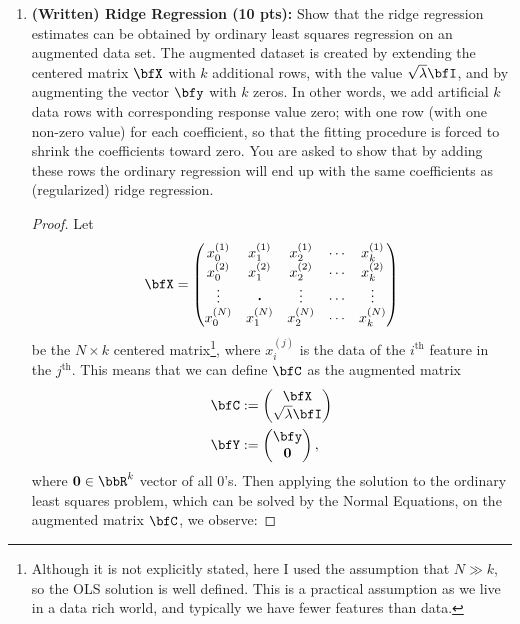 \documentclass[a4paper,12pt]{article}
\theoremstyle{definition}
\theoremstyle{remark}
\begin{document}
\begin{enumerate}
	\item {\bf (Written) Ridge Regression (10 pts):} Show that the ridge regression estimates can be obtained by ordinary least squares regression on an augmented data set. The augmented dataset is created by extending the centered matrix $\bfX$ with $k$ additional rows, with the value $\sqrt{\lambda}\bfI$, and by augmenting the vector $\bfy$ with $k$ zeros. In other words, we add artificial $k$ data rows with corresponding response value zero; with one row (with one non-zero value) for each coefficient, so that the fitting procedure is forced to shrink the coefficients toward zero. You are asked to show that by adding these rows the ordinary regression will end up with the same coefficients as (regularized) ridge regression.
	\begin{proof}
		Let 
		\begin{align}
			\bfX = \begin{pmatrix}
				x_0^{(1)} & x_1^{(1)} & x_2^{(1)}& \cdots & x_k^{(1)}\\
				x_0^{(2)} & x_1^{(2)} & x_2^{(2)}& \cdots & x_k^{(2)}\\
				\vdots & \vdot&\vdots& \cdots & \vdots\\
				x_0^{(N)} & x_1^{(N)} & x_2^{(N)}& \cdots & x_k^{(N)}\\
			\end{pmatrix}
		\end{align}
		be the $N\times k$ centered matrix\footnote{Although it is not explicitly stated, here I used the assumption that $N\gg k$, so the OLS solution is well defined. This is a practical assumption as we live in a data rich world, and typically we have fewer features than data.}, where $x_i^{(j)}$ is the data of the $i^{\text{th}}$ feature in the  $j^{\text{th}}$. This means that we can define $\bfC$ as the augmented matrix
		\begin{align}
			\bfC &:= \begin{pmatrix}
				\bfX\\
				\sqrt{\lambda}\bfI
			\end{pmatrix}\\
			\bfY &:= \begin{pmatrix}
				\bfy\\
				\mathbf{0}
			\end{pmatrix},
		\end{align}
		where $\mathbf{0}\in \bbR^k$ vector of all 0's. Then applying the solution to the ordinary least squares problem, which can be solved by the Normal Equations, on the augmented matrix $\bfC$, we observe:

\end{proof}
\end{enumerate}
\end{document}

